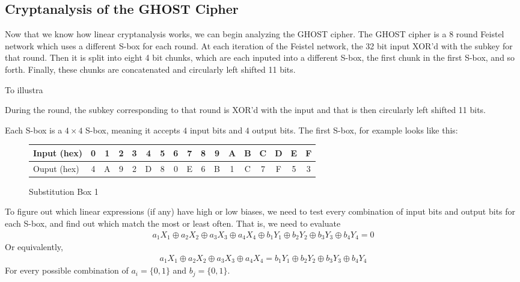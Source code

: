 \documentclass[12pt, a4paper, final]{report}
\begin{document}
\subsection{Cryptanalysis of the GHOST Cipher}

Now that we know how linear cryptanalysis works, we can begin analyzing the
GHOST cipher. The GHOST cipher is a 8 round Feistel network which uses a
different S-box for each round. At each iteration of the Feistel network, the
32 bit input XOR'd with the subkey for that round. Then it is split into eight
4 bit chunks, which are each inputed into a different S-box, the first chunk in
the first S-box, and so forth. Finally, these chunks are concatenated and
circularly left shifted 11 bits.

To illustra

During the round, the subkey corresponding
to that round is XOR'd with the input and that is then circularly left shifted
11 bits.

Each S-box is a $4 \times 4$ S-box, meaning it accepts $4$ input bits and $4$
output bits. The first S-box, for example looks like this:
\begin{figure}[h]
\begin{center}
\begin{tabular}{l*{16}{c}}
\toprule
Input (hex) & 0 & 1 & 2 & 3 & 4 & 5 & 6 & 7 & 8 & 9 & A & B & C & D & E & F\\
\midrule
Ouput (hex) & 4 & A & 9 & 2 & D & 8 & 0 & E & 6 & B & 1 & C & 7 & F & 5 & 3\\
\bottomrule
\end{tabular}
\end{center}
\caption{Substitution Box 1}
\end{figure}

To figure out which linear expressions (if any) have high or low biases, we need
to test every combination of input bits and output bits for each S-box, and
find out which match the most or least often. That is, we need to evaluate
\begin{align*}
    a_1X_1 \oplus a_2X_2 \oplus a_3X_3 \oplus a_4X_4 \oplus
    b_1Y_1 \oplus b_2Y_2 \oplus b_3Y_3 \oplus b_4Y_4 = 0
\end{align*}
Or equivalently,
\begin{align*}
    a_1X_1 \oplus a_2X_2 \oplus a_3X_3 \oplus a_4X_4 =
    b_1Y_1 \oplus b_2Y_2 \oplus b_3Y_3 \oplus b_4Y_4
\end{align*}
For every possible combination of $a_i = \{0, 1\}$ and $b_j = \{0, 1\}$.
\end{document}
